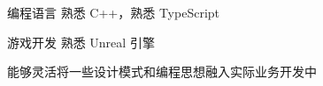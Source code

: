 

\begin{cvskills}

  \cvskill
    {编程语言} %
    {熟悉 C++，熟悉 TypeScript} %

  \cvskill
    {游戏开发} %
    {熟悉 Unreal 引擎} %

  \cvskill
    {} %
    {能够灵活将一些设计模式和编程思想融入实际业务开发中} %

\end{cvskills}
